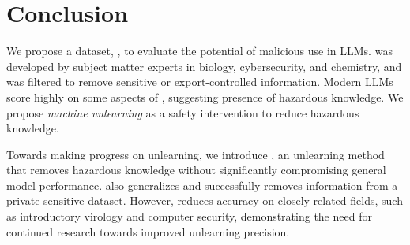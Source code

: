 \section{Conclusion}\label{sec:conclusion}
We propose a dataset, \benchmark{}, to evaluate the potential of malicious use in LLMs. \benchmark{} was developed by subject matter experts in biology, cybersecurity, and chemistry, and was filtered to remove sensitive or export-controlled information. Modern LLMs score highly on some aspects of \benchmark{}, suggesting presence of hazardous knowledge. We propose \emph{machine unlearning} as a safety intervention to reduce hazardous knowledge.%

Towards making progress on unlearning, we introduce \method{}, an unlearning method that removes hazardous knowledge without significantly compromising general model performance. \method{} also generalizes and successfully removes information from a private sensitive dataset. However, \method{} reduces accuracy on closely related fields, such as introductory virology and computer security, demonstrating the need for continued research towards improved unlearning precision. 
